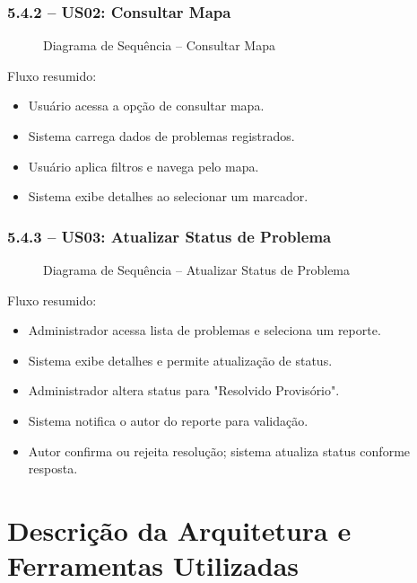 \documentclass[12pt,a4paper]{article}
\begin{document}
\subsubsection{5.4.2 – US02: Consultar Mapa}

\begin{figure}[H]
    \centering
    
    \caption{Diagrama de Sequência – Consultar Mapa}
\end{figure}

Fluxo resumido:
\begin{itemize}
    \item Usuário acessa a opção de consultar mapa.
    \item Sistema carrega dados de problemas registrados.
    \item Usuário aplica filtros e navega pelo mapa.
    \item Sistema exibe detalhes ao selecionar um marcador.
\end{itemize}

\subsubsection{5.4.3 – US03: Atualizar Status de Problema}

\begin{figure}[H]
    \centering
    
    \caption{Diagrama de Sequência – Atualizar Status de Problema}
\end{figure}

Fluxo resumido:
\begin{itemize}
    \item Administrador acessa lista de problemas e seleciona um reporte.
    \item Sistema exibe detalhes e permite atualização de status.
    \item Administrador altera status para "Resolvido Provisório".
    \item Sistema notifica o autor do reporte para validação.
    \item Autor confirma ou rejeita resolução; sistema atualiza status conforme resposta.
\end{itemize}

\section{Descrição da Arquitetura e Ferramentas Utilizadas}
\label{sec:arquitetura}
\end{document}
